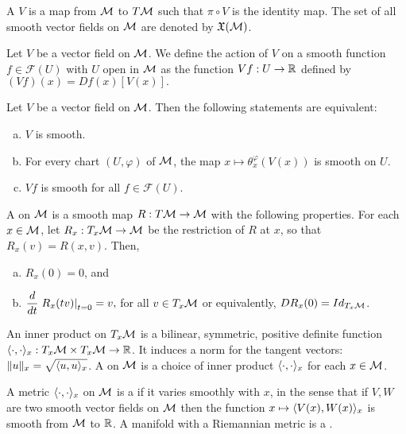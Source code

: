 \documentclass[11pt,a4paper]{article}
\begin{document}
\begin{mydef}
A  $V$ is a map from $\mathcal{M}$ to $T\mathcal{M}$ such that $\pi\circ V$ is the identity map. The set of all smooth vector fields on $\mathcal{M}$ are denoted by $\mathfrak{X}(\mathcal{M})$.
\end{mydef}

Let $V$ be a vector field on $\mathcal{M}$. We define the action of $V$ on a smooth function $f\in \mathcal{F}(U)$ with $U$ open in $\mathcal{M}$ as the function $Vf:U\rightarrow \mathbb{R}$ defined by $(Vf)(x) = Df(x)[V(x)].$

\begin{prop}
Let $V$ be a vector field on $\mathcal{M}$. Then the following statements are equivalent:
\begin{enumerate}[(a)]
    \item $V$ is smooth.
    \item For every chart $(U,\varphi)$ of $\mathcal{M}$, the map $x\mapsto \theta_x^\varphi(V(x))$ is smooth on $U$.
    \item $Vf$ is smooth for all $f\in \mathcal{F}(U)$.
\end{enumerate}
\end{prop}

\begin{mydef}\label{def:retraction}
A  on $\mathcal{M}$ is a smooth map $R:T\mathcal{M}\rightarrow \mathcal{M}$ with the following properties. For each $x\in \mathcal{M}$, let $R_x:T_x\mathcal{M}\rightarrow \mathcal{M}$ be the restriction of $R$ at $x$, so that $R_x(v) = R(x,v)$. Then,
\begin{enumerate}[(a)]
    \item $R_x(0) = 0$, and
    \item $\dfrac{d}{dt}\left.R_x(tv)\right|_{t = 0} = v,$ for all $v\in T_x\mathcal{M}$ or equivalently, $DR_x(0) = Id_{T_x\mathcal{M}}$.
\end{enumerate}
\end{mydef}

\begin{mydef}
An inner product on $T_x\mathcal{M}$ is a bilinear, symmetric, positive definite function $\langle \cdot, \cdot \rangle_x:T_x\mathcal{M}\times T_x\mathcal{M}\rightarrow \mathbb{R}$. It induces a norm for the tangent vectors: $\|u\|_x = \sqrt{\langle u, u \rangle_x}$. A  on $\mathcal{M}$ is a choice of inner product $\langle \cdot, \cdot \rangle_x$ for each $x\in \mathcal{M}$. 
\end{mydef}

\begin{mydef}
A metric $\langle \cdot, \cdot \rangle_x$ on $\mathcal{M}$ is a  if it varies smoothly with $x$, in the sense that if $V,W$ are two smooth vector fields on $\mathcal{M}$ then the function $x\mapsto \langle V(x), W(x) \rangle_x$ is smooth from $\mathcal{M}$ to $\mathbb{R}$. A manifold with a Riemannian metric is a .
\end{mydef}
\end{document}
